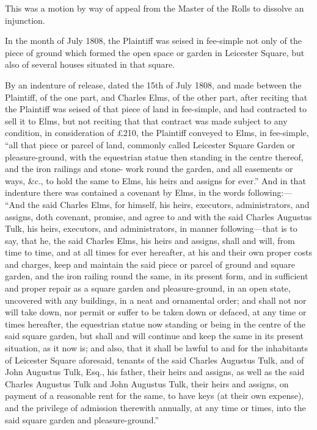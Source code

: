 


This was a motion by way of appeal from the Master of the Rolls to dissolve an
injunction.

In the month of July 1808, the Plaintiff was seised in fee-simple not only of
the piece of ground which formed the open space or garden in Leicester Square,
but also of several houses situated in that square.

By an indenture of release, dated the 15th of July 1808, and made between the
Plaintiff, of the one part, and Charles Elms, of the other part, after reciting
that the Plaintiff was seised of that piece of land in fee-simple, and had
contracted to sell it to Elms, but not reciting that that contract was made
subject to any condition, in consideration of {\pounds}210, the Plaintiff
conveyed to Elms, in fee-simple, ``all that piece or parcel of land, commonly
called Leicester Square Garden or pleasure-ground, with the equestrian statue
then standing in the centre thereof, and the iron railings and stone- work round
the garden, and all easements or ways, \&c., to hold the same to Elms, his heirs
and assigns for ever.'' And in that indenture there was contained a covenant by
Elms, in the words following:--- ``And the said Charles Elms, for himself, his
heirs, executors, administrators, and assigns, doth covenant, promise, and agree
to and with the said Charles Augustus Tulk, his heirs, executors, and
administrators, in manner following---that is to say, that he, the said Charles
Elms, his heirs and assigns, shall and will, from time to time, and at all times
for ever hereafter, at his and their own proper costs and charges, keep and
maintain the said piece or parcel of ground and square garden, and the iron
railing round the same, in its present form, and in sufficient and proper repair
as a square garden and pleasure-ground, in an open state, uncovered with any
buildings, in a neat and ornamental order; and shall not nor will take down, nor
permit or suffer to be taken down or defaced, at any time or times hereafter,
the equestrian statue now standing or being in the centre of the said square
garden, but shall and will continue and keep the same in its present situation,
as it now is; and also, that it shall be lawful to and for the inhabitants of
Leicester Square aforesaid, tenants of the said Charles Augustus Tulk, and of
John Augustus Tulk, Esq., his father, their heirs and assigns, as well as the
said Charles Augustus Tulk and John Augustus Tulk, their heirs and assigns, on
payment of a reasonable rent for the same, to have keys (at their own expense),
and the privilege of admission therewith annually, at any time or times, into
the said square garden and pleasure-ground.''

